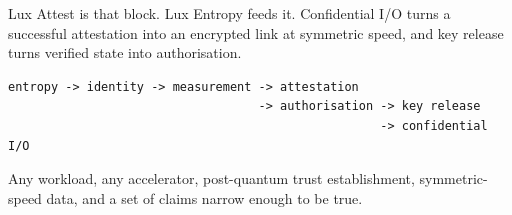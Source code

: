 \documentclass[11pt,a4paper]{article}
\begin{document}
Lux Attest is that block. Lux Entropy feeds it. Confidential I/O turns a
successful attestation into an encrypted link at symmetric speed, and key
release turns verified state into authorisation.

\begin{lstlisting}
entropy -> identity -> measurement -> attestation
                                   -> authorisation -> key release
                                                    -> confidential I/O
\end{lstlisting}

Any workload, any accelerator, post-quantum trust establishment, symmetric-speed
data, and a set of claims narrow enough to be true.
\end{document}
